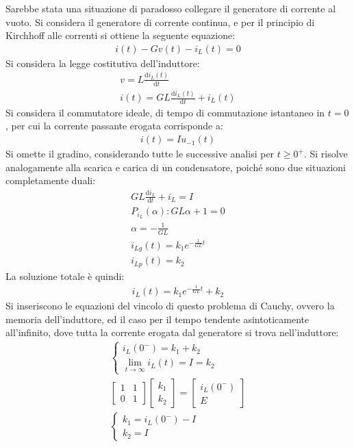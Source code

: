 \documentclass{article}
\newcommand{\df}{\mathrm{d}}
\numberwithin{equation}{subsection}
\begin{document}
Sarebbe stata una situazione di paradosso collegare il generatore di corrente al vuoto. Si considera il generatore di corrente continua, e per il principio di Kirchhoff alle 
correnti si ottiene la seguente equazione:
\begin{gather*}
    i(t)-Gv(t)-i_L(t)=0
\end{gather*}
Si considera la legge costitutiva dell'induttore:
\begin{gather*}
    v=L\displaystyle\frac{\df i_L(t)}{\df t}\\
    i(t)=GL\displaystyle\frac{\df i_L(t)}{\df t}+i_L(t)
\end{gather*}
Si considera il commutatore ideale, di tempo di commutazione istantaneo in $t=0$, per cui la corrente passante erogata corrisponde a:
\begin{gather*}
    i(t)=Iu_{-1}(t)
\end{gather*}
Si omette il gradino, considerando tutte le successive analisi per $t\geq0^+$. Si risolve analogamente alla scarica e carica di un condensatore, poiché sono due situazioni 
completamente duali:
\begin{gather*}
    GL\displaystyle\frac{\df i_L}{\df t}+i_L=I\\
    P_{i_L}(\alpha):GL\alpha+1=0\\
    \alpha=\displaystyle-\frac{1}{GL}\\
    i_{Lg}(t)=k_1e^{-\frac{1}{GL}t}\\
    i_{Lp}(t)=k_2
\end{gather*}
La soluzione totale è quindi:
\begin{gather*}
    i_L(t)=k_1e^{-\frac{1}{GL}t}+k_2
\end{gather*}
Si inseriscono le equazioni del vincolo di questo problema di Cauchy, ovvero la memoria dell'induttore, ed il caso per il tempo tendente asintoticamente all'infinito, dove 
tutta la corrente erogata dal generatore si trova nell'induttore:
\begin{gather*}
    \begin{cases}
        i_L(0^-)=k_1+k_2\\
        \displaystyle\lim_{t\to\infty}i_L(t)=I=k_2
    \end{cases}\\
    \begin{bmatrix}
        1&1\\0&1
    \end{bmatrix}\begin{bmatrix}
        k_1\\k_2
    \end{bmatrix}=\begin{bmatrix}
        i_L(0^-)\\E
    \end{bmatrix}\\
    \begin{cases}
        k_1=i_L(0^-)-I\\
        k_2=I
    \end{cases}
\end{gather*}
\end{document}

